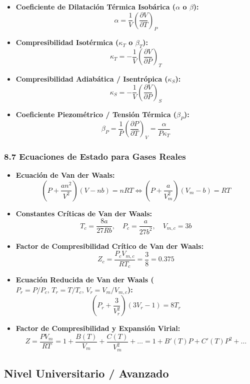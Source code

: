 \documentclass[11pt,a4paper]{article}
\begin{document}
\begin{itemize}
  \item \textbf{Coeficiente de Dilatación Térmica Isobárica ($\alpha$ o $\beta$):}
  \[
    \alpha = \frac{1}{V} \left( \frac{\partial V}{\partial T} \right)_P
  \]
  \item \textbf{Compresibilidad Isotérmica ($\kappa_T$ o $\beta_T$):}
  \[
    \kappa_T = -\frac{1}{V} \left( \frac{\partial V}{\partial P} \right)_T
  \]
  \item \textbf{Compresibilidad Adiabática / Isentrópica ($\kappa_S$):}
  \[
    \kappa_S = -\frac{1}{V} \left( \frac{\partial V}{\partial P} \right)_S
  \]
  \item \textbf{Coeficiente Piezométrico / Tensión Térmica ($\beta_P$):}
  \[
    \beta_P = \frac{1}{P} \left( \frac{\partial P}{\partial T} \right)_V = \frac{\alpha}{P \kappa_T}
  \]
\end{itemize}

\subsubsection*{8.7 Ecuaciones de Estado para Gases Reales}

\begin{itemize}
  \item \textbf{Ecuación de Van der Waals:}
  \[
    \left( P + \frac{a n^2}{V^2} \right)(V - n b) = n R T \iff \left( P + \frac{a}{V_m^2} \right)(V_m - b) = R T
  \]
  \item \textbf{Constantes Críticas de Van der Waals:}
  \[
    T_c = \frac{8a}{27Rb}, \quad P_c = \frac{a}{27b^2}, \quad V_{m,c} = 3b
  \]
  \item \textbf{Factor de Compresibilidad Crítico de Van der Waals:}
  \[
    Z_c = \frac{P_c V_{m,c}}{R T_c} = \frac{3}{8} = 0.375
  \]
  \item \textbf{Ecuación Reducida de Van der Waals ($P_r = P/P_c, \, T_r = T/T_c, \, V_r = V_m/V_{m,c}$):}
  \[
    \left( P_r + \frac{3}{V_r^2} \right)(3V_r - 1) = 8T_r
  \]
  \item \textbf{Factor de Compresibilidad y Expansión Virial:}
  \[
    Z = \frac{P V_m}{R T} = 1 + \frac{B(T)}{V_m} + \frac{C(T)}{V_m^2} + \dots = 1 + B'(T)P + C'(T)P^2 + \dots
  \]
\end{itemize}

\subsection*{Nivel Universitario / Avanzado}
\end{document}
